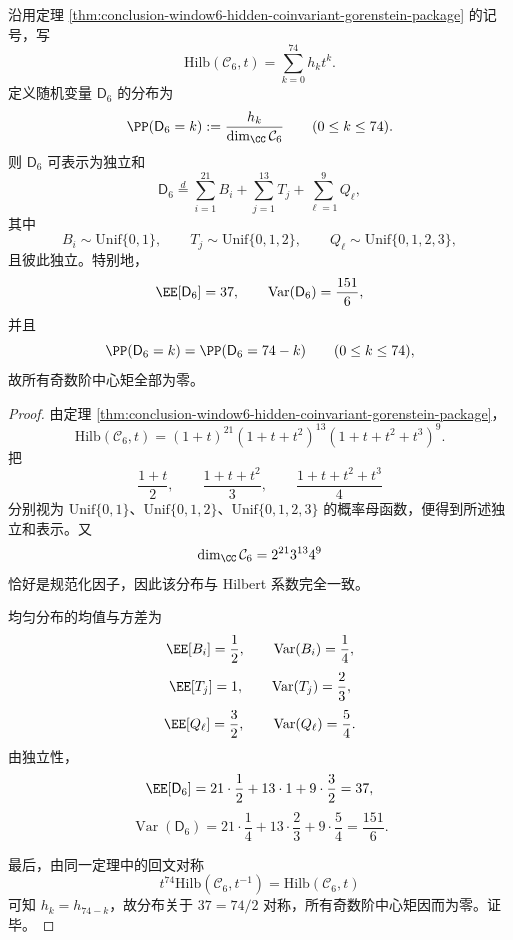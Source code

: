 \begin{theorem}\label{thm:conclusion-window6-hidden-coinvariant-uniform-sum}
沿用定理 \ref{thm:conclusion-window6-hidden-coinvariant-gorenstein-package} 的记号，写
\[
\mathrm{Hilb}(\mathcal C_6,t)=\sum_{k=0}^{74}h_k t^k.
\]
定义随机变量 \(\mathsf D_6\) 的分布为
\[
\PP(\mathsf D_6=k):=\frac{h_k}{\dim_{\CC}\mathcal C_6}
\qquad (0\le k\le 74).
\]
则 \(\mathsf D_6\) 可表示为独立和
\[
\mathsf D_6
\overset{d}{=}
\sum_{i=1}^{21}B_i+\sum_{j=1}^{13}T_j+\sum_{\ell=1}^{9}Q_\ell,
\]
其中
\[
B_i\sim \mathrm{Unif}\{0,1\},
\qquad
T_j\sim \mathrm{Unif}\{0,1,2\},
\qquad
Q_\ell\sim \mathrm{Unif}\{0,1,2,3\},
\]
且彼此独立。特别地，
\[
\EE[\mathsf D_6]=37,
\qquad
\operatorname{Var}(\mathsf D_6)=\frac{151}{6},
\]
并且
\[
\PP(\mathsf D_6=k)=\PP(\mathsf D_6=74-k)
\qquad (0\le k\le 74),
\]
故所有奇数阶中心矩全部为零。
\end{theorem}
\begin{proof}
由定理 \ref{thm:conclusion-window6-hidden-coinvariant-gorenstein-package}，
\[
\mathrm{Hilb}(\mathcal C_6,t)
=(1+t)^{21}(1+t+t^2)^{13}(1+t+t^2+t^3)^9.
\]
把
\[
\frac{1+t}{2},
\qquad
\frac{1+t+t^2}{3},
\qquad
\frac{1+t+t^2+t^3}{4}
\]
分别视为 \(\mathrm{Unif}\{0,1\}\)、\(\mathrm{Unif}\{0,1,2\}\)、\(\mathrm{Unif}\{0,1,2,3\}\) 的概率母函数，便得到所述独立和表示。又
\[
\dim_{\CC}\mathcal C_6
=2^{21}3^{13}4^9
\]
恰好是规范化因子，因此该分布与 Hilbert 系数完全一致。

均匀分布的均值与方差为
\[
\EE[B_i]=\frac12,\qquad \operatorname{Var}(B_i)=\frac14,
\]
\[
\EE[T_j]=1,\qquad \operatorname{Var}(T_j)=\frac23,
\]
\[
\EE[Q_\ell]=\frac32,\qquad \operatorname{Var}(Q_\ell)=\frac54.
\]
由独立性，
\[
\EE[\mathsf D_6]
=21\cdot\frac12+13\cdot 1+9\cdot\frac32
=37,
\]
\[
\operatorname{Var}(\mathsf D_6)
=21\cdot\frac14+13\cdot\frac23+9\cdot\frac54
=\frac{151}{6}.
\]

最后，由同一定理中的回文对称
\[
t^{74}\mathrm{Hilb}(\mathcal C_6,t^{-1})=\mathrm{Hilb}(\mathcal C_6,t)
\]
可知 \(h_k=h_{74-k}\)，故分布关于 \(37=74/2\) 对称，所有奇数阶中心矩因而为零。证毕。
\end{proof}

